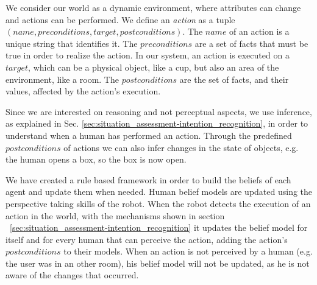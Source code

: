 We consider our world as a dynamic environment, where attributes can change and actions can be performed.  We define an \textit{action} as a tuple $(name, preconditions, target, postconditions)$. The $name$ of an action is a unique string that identifies it. The $preconditions$ are a set of facts that must be true in order to realize the action. In our system, an action is executed on a $target$, which can be a physical object, like a cup, but also an area of the environment, like a room. The $postconditions$ are the set of facts, and their values, affected by the action's execution.

Since we are interested on reasoning and not perceptual aspects, we use inference, as explained in Sec. \ref{sec:situation_assessment-intention_recognition}, in order to understand when a human has performed an action. Through the predefined $postconditions$ of actions we can also infer changes in the state of objects, e.g. the human opens a box, so the box is now open. 

We have created a rule based framework in order to build the beliefs of each agent and update them when needed. Human belief models are updated using the perspective taking skills of the robot. When the robot detects the execution of an action in the world, with the mechanisms shown in section ~\ref{sec:situation_assessment-intention_recognition}
it updates the belief model for itself and for every human that can perceive the action, adding the action's $postconditions$ to their models. When an action is not perceived by a human (e.g. the user was in an other room), his belief model will not be updated, as he is not aware of the changes that occurred.

